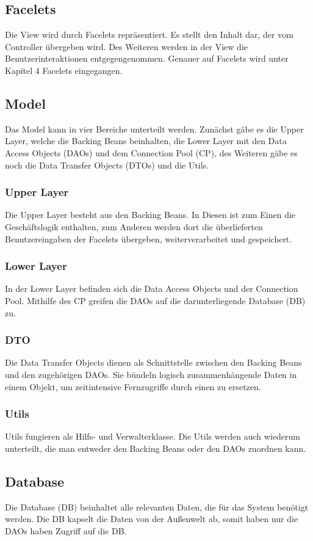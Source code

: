     \subsection{Facelets}
    	Die View wird durch Facelets repräsentiert. Es stellt den Inhalt dar, der vom Controller übergeben wird. Des Weiteren werden in der View die Benutzerinteraktionen entgegengenommen. Genauer auf Facelets wird unter Kapitel 4 Facelets eingegangen.
   	\subsection{Model}
   	Das Model kann in vier Bereiche unterteilt werden. Zunächst gäbe es die \glqq Upper Layer\grqq{}, welche die Backing Beans beinhalten, die \glqq Lower Layer\grqq{} mit den Data Access Objects (DAOs) und dem Connection Pool (CP), des Weiteren gäbe es noch die Data Transfer Objects (DTOs) und die Utils. 
   		\subsubsection{Upper Layer}
   		Die \glqq Upper Layer\grqq{} besteht aus den Backing Beans. In Diesen ist zum Einen die Geschäftslogik enthalten, zum Anderen werden dort die überlieferten Benutzereingaben der Facelets übergeben, weiterverarbeitet und gespeichert.
    	\subsubsection{Lower Layer}
    	In der \glqq Lower Layer\grqq{} befinden sich die Data Access Objects und der Connection Pool. Mithilfe des CP greifen die DAOs auf die darunterliegende Database (DB) zu.
    	\subsubsection{DTO}
    	Die Data Transfer Objects dienen als Schnittstelle zwischen den Backing Beans und den zugehörigen DAOs. Sie bündeln logisch zusammenhängende Daten in einem Objekt, um zeitintensive Fernzugriffe durch einen zu ersetzen.
    	\subsubsection{Utils}
    	Utils fungieren als Hilfs- und Verwalterklasse. Die Utils werden auch wiederum unterteilt, die man entweder den Backing Beans oder den DAOs zuordnen kann. 
    \subsection{Database}
    Die Database (DB) beinhaltet alle relevanten Daten, die für das System benötigt werden. Die DB kapselt die Daten von der Außenwelt ab, somit haben nur die DAOs haben Zugriff auf die DB. 
